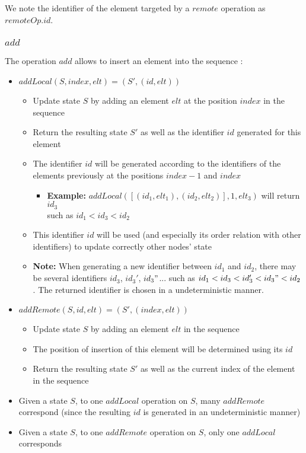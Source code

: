 \documentclass[a4paper]{article}
\begin{document}
We note the identifier of the element targeted by a $remote$ operation as $remoteOp.id$.
\subsubsection{$add$}

The operation $add$ allows to insert an element into the sequence :
\begin{itemize}
  \item $addLocal(S, index, elt) = (S', (id, elt))$
  \begin{itemize}
    \item Update state $S$ by adding an element $elt$ at the position $index$ in the sequence
    \item Return the resulting state $S'$ as well as the identifier $id$ generated for this element
    \item The identifier $id$ will be generated according to the identifiers of the elements previously at the positions $index-1$ and $index$
    \begin{itemize}
      \item \textbf{Example: } $addLocal([(id_1, elt_1), (id_2, elt_2)], 1, elt_3)$ will return $id_3$\\ such as $id_1 < id_3 < id_2$
    \end{itemize}
    \item This identifier $id$ will be used (and especially its order relation with other identifiers) to update correctly other nodes' state
    \item \textbf{Note: } When generating a new identifier between $id_1$ and $id_2$,
      there may be several identifiers $id_3$, $id_3'$, $id_3"$... such as
      $id_1 < id_3 < id_3' < id_3" < id_2$. The returned identifier is chosen in a undeterministic manner.
  \end{itemize}
  \item $addRemote(S, id, elt) = (S', (index, elt))$
  \begin{itemize}
    \item Update state $S$ by adding an element $elt$ in the sequence
    \item The position of insertion of this element will be determined using its $id$
    \item Return the resulting state $S'$ as well as the current index of the element in the sequence
  \end{itemize}
  \item Given a state $S$, to one $addLocal$ operation on $S$, many $addRemote$ correspond
    (since the resulting $id$ is generated in an undeterministic manner)
  \item Given a state $S$, to one $addRemote$ operation on $S$, only one $addLocal$ corresponds
\end{itemize}
\end{document}
